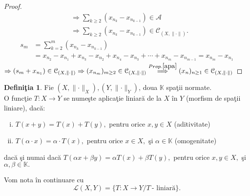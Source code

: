 \documentclass[ a4paper, 12pt]{report}
\theoremstyle{definition}
\newtheorem{definition}{\bf Defini\c tia}[section]
\theoremstyle{remark}
\numberwithin{equation}{section}
\begin{document}
\begin{proof}
\begin{align*}
 &\Rightarrow \sum\limits_{k \geq 2} (x_{n_k} - x_{n_{k-1}}) \in \mathcal{A}\\
 &\Rightarrow \sum\limits_{k \geq 2}(x_{n_k} - x_{n_{k-1}}) \in \mathcal{C}_{(X, \lVert \cdot \rVert)}.
 \end{align*}
\begin{align*}
s_m &= \sum\limits_{k=2}^{m}(x_{n_k}-x_{n_{k-1}})\\
&=x_{n_2}-x_{n_1}+x_{n_3}-x_{n_2}+x_{n_4}-x_{n_3}+\cdots+x_{n_m}-x_{n_{m-1}}=x_{n_m}-x_{n_1}
\end{align*}
$\Rightarrow (s_m + x_{n_1}) \in \mathcal{C}_{(X, \Vert \cdot \rVert)} \Rightarrow (x_{n_m})_{m \geq 2} \in \mathcal{C}_{(X, \lVert \cdot \rVert)} \stackrel{Prop. \ref{apa}}{\Longrightarrow}
 (x_n)_{n \geq 1} \in \mathcal{C}_{(X, \Vert \cdot \rVert)}$

\end{proof}
\begin{definition}
Fie $(X,\lVert \cdot \rVert_{X}), (Y,\lVert \cdot \rVert_{Y})$, doua $\mathbb{K}$ spa\c tii normate.\\
O func\c tie $T : X \rightarrow Y$ se nume\c ste aplica\c tie liniar\u a de la $X$ \^in $Y$ (morfism de spa\c tii liniare), dac\u a:\\
\begin{enumerate}[(i)]
\item $T(x+y) = T(x) + T(y),$ pentru orice $x,y \in X$ (aditivitate)
\item $T(\alpha \cdot x) = \alpha \cdot T(x),$ pentru orice $x \in X,$ \c si $\alpha \in \mathbb{K}$ (omogenitate)
\end{enumerate} dac\u a \c si numai dac\u a $T(\alpha x + \beta y) = \alpha T(x) + \beta T(y),$ pentru orice $x,y \in X,$ \c si $\alpha,\beta \in \mathbb{K}.$
\end{definition}
Vom nota \^in continuare cu
$$\mathcal{L}(X,Y) = \{ T: X \rightarrow Y / T\ \mbox{- liniar\u a} \}.$$
\end{document}
